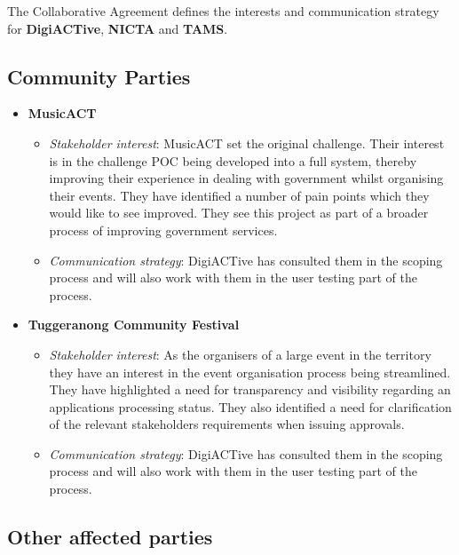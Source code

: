 \documentclass[12pt,a4paper,twosided]{article}
\begin{document}
The Collaborative Agreement defines the interests and communication
strategy for \textbf{DigiACTive}, \textbf{NICTA} and \textbf{TAMS}.

\subsection{Community Parties}

\begin{itemize}
\itemsep1pt\parskip0pt
\item
  \textbf{MusicACT}

  \begin{itemize}
  \itemsep1pt\parskip0pt
  \item
    \emph{Stakeholder interest}: MusicACT set the original challenge.
    Their interest is in the challenge POC being developed into a full
    system, thereby improving their experience in dealing with
    government whilst organising their events. They have identified a
    number of pain points which they would like to see improved. They
    see this project as part of a broader process of improving
    government services.
  \item
    \emph{Communication strategy}: DigiACTive has consulted them in the
    scoping process and will also work with them in the user testing
    part of the process.
  \end{itemize}
\item
  \textbf{Tuggeranong Community Festival}

  \begin{itemize}
  \itemsep1pt\parskip0pt
  \item
    \emph{Stakeholder interest}: As the organisers of a large event in
    the territory they have an interest in the event organisation
    process being streamlined. They have highlighted a need for
    transparency and visibility regarding an applications processing
    status. They also identified a need for clarification of the
    relevant stakeholders requirements when issuing approvals.
  \item
    \emph{Communication strategy}: DigiACTive has consulted them in the
    scoping process and will also work with them in the user testing
    part of the process.
  \end{itemize}
\end{itemize}

\subsection{Other affected parties}
\end{document}
